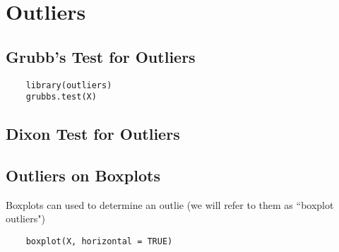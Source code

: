 \section{Outliers}
\subsection{Grubb's Test for Outliers}
\begin{framed}
	\begin{verbatim}
	library(outliers)
	grubbs.test(X)
	\end{verbatim}
\end{framed}
\subsection{Dixon Test for Outliers}
\subsection{Outliers on Boxplots}
Boxplots can used to determine an outlie (we will refer to them as ``boxplot outliers")
\begin{framed}
	\begin{verbatim}
	boxplot(X, horizontal = TRUE)
	\end{verbatim}
\end{framed}

\newpage
